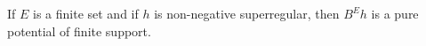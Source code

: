 If $E$ is a finite set and if $h$ is non-negative superregular, then $B^E h$ is a pure potential of finite support.
